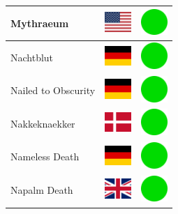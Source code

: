 \documentclass[12pt, a4paper, twoside]{report}
\begin{document}
\begin{center}
\begin{longtable}{|p{5cm}|p{2cm}|p{2cm}|}
 Mythraeum                                                  & \includegraphics[width=1cm]{../4x3/us} &   \includegraphics[width=1cm]{../likes/y} \\ \hline
 Nachtblut                                                  & \includegraphics[width=1cm]{../4x3/de} &   \includegraphics[width=1cm]{../likes/y} \\ \hline
 Nailed to Obscurity                                        & \includegraphics[width=1cm]{../4x3/de} &   \includegraphics[width=1cm]{../likes/y} \\ \hline
 Nakkeknaekker                                              & \includegraphics[width=1cm]{../4x3/dk} &   \includegraphics[width=1cm]{../likes/y} \\ \hline
 Nameless Death                                             & \includegraphics[width=1cm]{../4x3/de} &   \includegraphics[width=1cm]{../likes/y} \\ \hline
 Napalm Death                                               & \includegraphics[width=1cm]{../4x3/gb} &   \includegraphics[width=1cm]{../likes/y} \\ \hline

\end{longtable}
\end{center}
\end{document}
